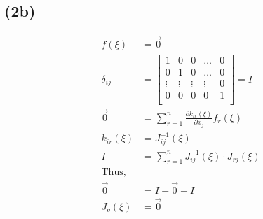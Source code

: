\documentclass{article}
\begin{document}
\subsection*{(2b)}

\begin{align*}
    f(\xi) &= \Vec{0}\\
    \delta_{ij} & = 
    \begin{bmatrix}
    1 & 0 &0 & \dots &0 \\[1ex]
    0 & 1 &0 & \dots &0 \\[1ex]
    \vdots & \vdots &\vdots &\vdots & 0 \\[1ex]
    0 & 0 &0 &0 & 1 \\[1ex]
    \end{bmatrix} = I \\
    \Vec{0} &= \sum_{r=1}^n \frac{\partial k_{ir}(\xi)}{\partial x_j} f_r(\xi) \\
    k_{ir}(\xi) &= J_{ij}^{-1}(\xi)\\
    I &= \sum_{r=1}^n J_{ij}^{-1}(\xi) \cdot J_{rj}(\xi) \\
    \text{Thus,}&\\
    \Vec{0} &= I - \Vec{0} - I \\
    J_g (\xi) &= \Vec{0}\\
\end{align*}
\end{document}
